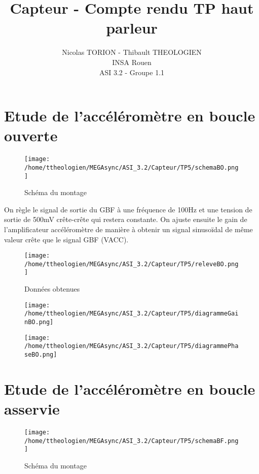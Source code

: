 \documentclass[a4paper,12pt]{article}
\title{Capteur - Compte rendu TP haut parleur}
\author{
	Nicolas TORION - Thibault THEOLOGIEN\\
	INSA Rouen\\
	ASI 3.2 - Groupe 1.1
}
\begin{document}
	\maketitle
	\tableofcontents
	\newpage

	\section{Etude de l'accéléromètre en boucle ouverte}
	\label{sec:Etude de l'accéléromètre en boucle ouverte}
		\begin{figure}[!h]
			\caption{Schéma du montage}
			\centering
			\texttt{[image: /home/ttheologien/MEGAsync/ASI\_3.2/Capteur/TP5/schemaBO.png]}
		\end{figure}

		\par On règle le signal de sortie du GBF à une fréquence de 100Hz et une tension de sortie de 500mV crête-crête qui restera constante.
		On ajuste ensuite le gain de l’amplificateur accéléromètre de manière à obtenir un signal sinusoïdal de même valeur crête que le signal GBF (VACC).

		\begin{figure}[!h]
			\caption{Données obtenues}
			\centering
			\texttt{[image: /home/ttheologien/MEGAsync/ASI\_3.2/Capteur/TP5/releveBO.png]}
		\end{figure}

		\begin{figure}[!h]
			\caption{}
			\centering
			\texttt{[image: /home/ttheologien/MEGAsync/ASI\_3.2/Capteur/TP5/diagrammeGainBO.png]}
		\end{figure}

		\begin{figure}[!h]
			\caption{}
			\centering
			\texttt{[image: /home/ttheologien/MEGAsync/ASI\_3.2/Capteur/TP5/diagrammePhaseBO.png]}
		\end{figure}

	\pagebreak

	\section{Etude de l'accéléromètre en boucle asservie}
	\label{sec:Etude de l'accéléromètre en boucle asservie}
		\begin{figure}[!h]
			\caption{Schéma du montage}
			\centering
			\texttt{[image: /home/ttheologien/MEGAsync/ASI\_3.2/Capteur/TP5/schemaBF.png]}
		\end{figure}
\end{document}
